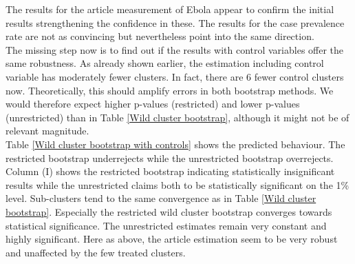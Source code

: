 \documentclass{article}
\begin{document}
The results for the article measurement of Ebola appear to confirm the initial results strengthening the confidence in these. The results for the case prevalence rate are not as convincing but nevertheless point into the same direction. \\
The missing step now is to find out if the results with control variables offer the same robustness. As already shown earlier, the estimation including control variable has moderately fewer clusters. In fact, there are 6 fewer control clusters now. Theoretically, this should amplify errors in both bootstrap methods. We would therefore expect higher p-values (restricted) and lower p-values (unrestricted) than in Table \ref{Wild cluster bootstrap}, although it might not be of relevant magnitude. \\
Table \ref{Wild cluster bootstrap with controls} shows the predicted behaviour. The restricted bootstrap underrejects while the unrestricted bootstrap overrejects. Column (I) shows the restricted bootstrap indicating statistically insignificant results while the unrestricted claims both to be statistically significant on the 1\% level. Sub-clusters tend to the same convergence as in Table \ref{Wild cluster bootstrap}. Especially the restricted wild cluster bootstrap converges towards statistical significance. The unrestricted estimates remain very constant and highly significant. Here as above, the article estimation seem to be very robust and unaffected by the few treated clusters.\\
\end{document}
